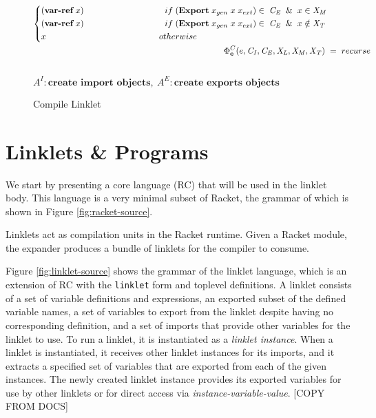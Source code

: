 \documentclass[sigplan,screen,anonymous]{acmart}
\def\dash {\text{-}}
\begin{document}
\begin{figure*}[tbp]
\begin{align*}
\begin{cases*}
      (\textbf{var\dash ref}\; x) \hspace{3.3cm} if\; (\textbf{Export}\; x_{gen}\; x\; x_{ext}) \in\;\mathit{C_E}\;\; \&\;\; x\in \mathit{X_M} \\
      (\textbf{var\dash ref}\; x) \hspace{3.3cm} if\; (\textbf{Export}\; x_{gen}\; x\; x_{ext}) \in\;\mathit{C_E}\;\; \&\;\; x\notin \mathit{X_T} \\
      x \hspace{4.6cm} otherwise
    \end{cases*} \\
    \Phi^C_{\textbf{e}}(e,\mathit{C_I}, \mathit{C_E}, \mathit{X_L},\mathit{X_M},\mathit{X_T})\; &=\; recurse \\
  \end{align*} \\
  \hfill \footnotesize $\mathit{A}^I : \textbf{create import objects},\: \mathit{A}^E : \textbf{create exports objects}$
\caption{Compile Linklet}
\label{fig:compile}
\end{figure*}



\section{Linklets \& Programs}

We start by presenting a core language (RC) that will be used in the
linklet body. This language is a very minimal subset of Racket, the
grammar of which is shown in Figure \ref{fig:racket-source}.

Linklets act as compilation units in the Racket runtime. Given a
Racket module, the expander produces a bundle of linklets for the
compiler to consume.

Figure \ref{fig:linklet-source} shows the grammar of the linklet
language, which is an extension of RC with the \verb|linklet| form and
toplevel definitions. A linklet consists of a set of variable
definitions and expressions, an exported subset of the defined
variable names, a set of variables to export from the linklet despite
having no corresponding definition, and a set of imports that provide
other variables for the linklet to use. To run a linklet, it is
instantiated as a {\it linklet instance}. When a linklet is
instantiated, it receives other linklet instances for its imports, and
it extracts a specified set of variables that are exported from each
of the given instances. The newly created linklet instance provides
its exported variables for use by other linklets or for direct access
via {\it instance-variable-value}. [COPY FROM DOCS]
\end{document}
